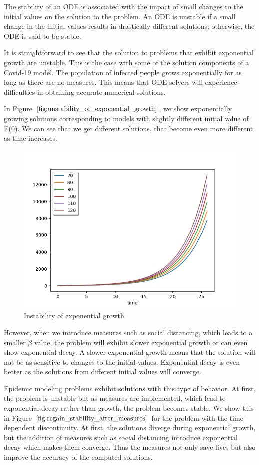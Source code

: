The stability of an ODE is associated with the impact of small changes to the initial values on the solution to the problem. An ODE is unstable if a small change in the initial values results in drastically different solutions; otherwise, the ODE is said to be stable.

It is straightforward to see that the solution to problems that exhibit exponential growth are unstable. This is the case with some of the solution components of a Covid-19 model. The population of infected people grows exponentially for as long as there are no measures. This means that ODE solvers will experience difficulties in obtaining accurate numerical solutions. 

In Figure $\ref{fig:unstability_of_exponential_growth}$, we show exponentially growing solutions corresponding to models with slightly different initial value of E(0). We can see that we get different solutions, that become even more different as time increases.

\begin{figure}[h]
\centering
\includegraphics[width=0.7\linewidth]{./figures/unstability_of_exponential_growth}
\caption{Instability of exponential growth}
\label{fig:unstability_of_exponential_growth}
\end{figure}

However, when we introduce measures such as social distancing, which leads to a smaller $\beta$ value, the problem will exhibit slower exponential growth or can even show exponential decay. A slower exponential growth means that the solution will not be as sensitive to changes to the initial values. Exponential decay is even better as the solutions from different initial values will converge.

Epidemic modeling problems exhibit solutions with this type of behavior. At first, the problem is unstable but as measures are implemented, which lead to exponential decay rather than growth, the problem becomes stable. We show this in Figure $\ref{fig:regain_stability_after_measures}$ for the problem with the time-dependent discontinuity. At first, the solutions diverge during exponential growth, but the addition of measures such as social distancing introduce exponential decay which makes them converge. Thus the measures not only save lives but also improve the accuracy of the computed solutions.

